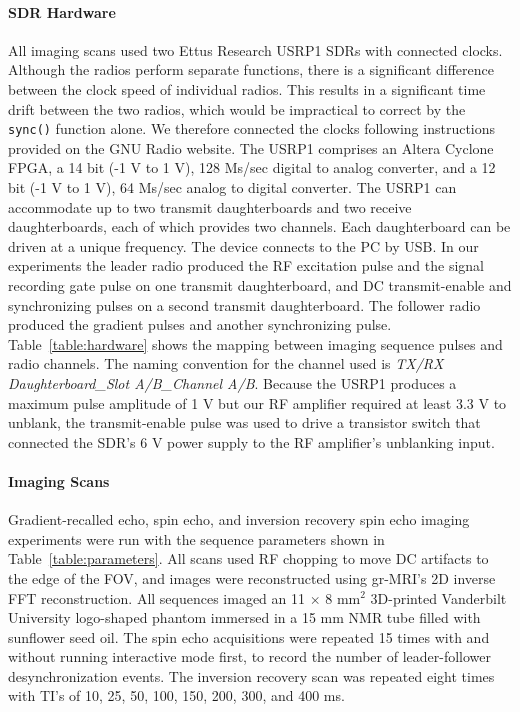 \documentclass[review]{elsarticle}
\begin{document}
\paragraph{SDR Hardware}
All imaging scans used two Ettus Research USRP1 SDRs with connected clocks.
Although the radios perform separate functions, there is a significant difference between the clock speed of individual radios.
This results in a significant time drift between the two radios, 
which would be impractical to correct by the \texttt{sync()} function alone.
We therefore connected the clocks following instructions provided on the GNU Radio website.
The USRP1 comprises an Altera Cyclone FPGA,
a 14 bit (-1 V to 1 V), 128 Ms/sec digital to analog converter,
and a 12 bit (-1 V to 1 V), 64 Ms/sec analog to digital converter.
The USRP1 can accommodate up to two transmit daughterboards and two receive daughterboards, 
each of which provides two channels.  
Each daughterboard can be driven at a unique frequency.
The device connects to the PC by USB.
In our experiments the leader radio produced the RF excitation pulse and the signal recording gate pulse on one transmit daughterboard, 
and DC transmit-enable and synchronizing pulses on a second transmit daughterboard.
The follower radio produced the gradient pulses and another synchronizing pulse.
Table~\ref{table:hardware} shows the mapping between imaging sequence pulses and radio channels. 
The naming convention for the channel used is \textit{TX/RX Daughterboard\_Slot A/B\_Channel A/B}. 
Because the USRP1 produces a maximum pulse amplitude of 1 V 
but our RF amplifier required at least 3.3 V to unblank,
the transmit-enable pulse was used to drive a transistor switch that connected the SDR's 6 V power supply to the RF amplifier's unblanking input.



\paragraph{Imaging Scans}
Gradient-recalled echo, spin echo, and inversion recovery spin echo imaging experiments were run with
the sequence parameters shown in Table~\ref{table:parameters}.
All scans used RF chopping to move DC artifacts to the edge of the FOV, 
and images were reconstructed using gr-MRI's 2D inverse FFT reconstruction. 
All sequences imaged an 11 $\times$ 8 mm$^2$ 3D-printed Vanderbilt University logo-shaped phantom
immersed in a 15 mm NMR tube filled with sunflower seed oil.
The spin echo acquisitions were repeated 15 times with and without running interactive mode first,
to record the number of leader-follower desynchronization events. 
The inversion recovery scan was repeated eight times with TI's of
10, 25, 50, 100, 150, 200, 300, and 400 ms. 
\end{document}
